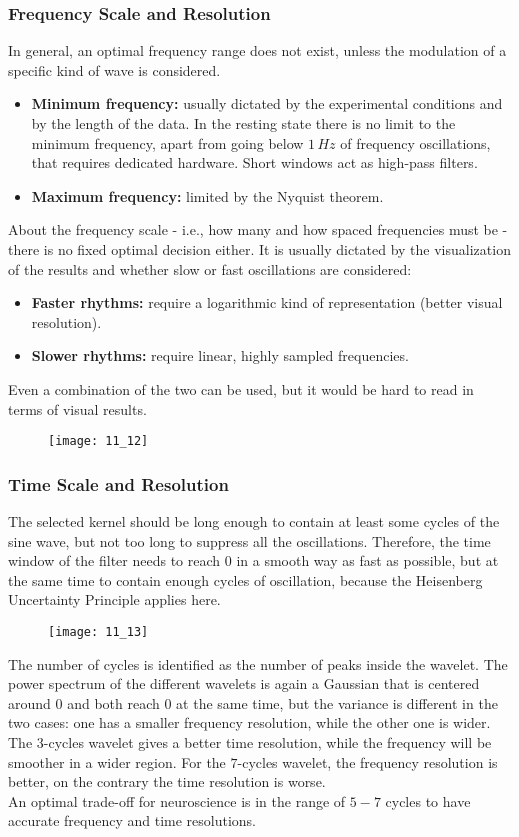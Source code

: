 \subsubsection{Frequency Scale and Resolution}
In general, an optimal frequency range does not exist, unless the modulation of a specific kind of wave is
considered.
\begin{itemize}
    \item \textbf{Minimum frequency:} usually dictated by the experimental conditions and by the length of the
    data. In the resting state there is no limit to the minimum frequency, apart from going below \(1\,Hz\)
    of frequency oscillations, that requires dedicated hardware. Short windows act as high-pass filters.
    \item \textbf{Maximum frequency:} limited by the Nyquist theorem.
\end{itemize}
About the frequency scale - i.e., how many and how spaced frequencies must be - there is no fixed optimal
decision either. It is usually dictated by the visualization of the results and whether slow or fast
oscillations are considered:
\begin{itemize}
    \item \textbf{Faster rhythms:} require a logarithmic kind of representation (better visual resolution).
    \item \textbf{Slower rhythms:} require linear, highly sampled frequencies.
\end{itemize}
Even a combination of the two can be used, but it would be hard to read in terms of visual results.
\begin{figure}[H]
    \texttt{[image: 11\_12]}
    \centering
\end{figure}
\subsubsection{Time Scale and Resolution}
The selected kernel should be long enough to contain at least some cycles of the sine wave, but not too long
to suppress all the oscillations. Therefore, the time window of the filter needs to reach 0 in a smooth way
as fast as possible, but at the same time to contain enough cycles of oscillation, because the Heisenberg
Uncertainty Principle applies here.
\begin{figure}[H]
    \texttt{[image: 11\_13]}
    \centering
\end{figure}
The number of cycles is identified as the number of peaks inside the
wavelet. The power spectrum of the different wavelets is again a Gaussian that is centered around 0 and both
reach 0 at the same time, but the variance is different in the two cases: one has a smaller frequency
resolution, while the other one is wider. The \(3\)-cycles wavelet gives a better time resolution, while the
frequency will be smoother in a wider region. For the \(7\)-cycles wavelet, the frequency resolution is better, on
the contrary the time resolution is worse.\\
An optimal trade-off for neuroscience is in the range of \(5-7\) cycles to have accurate frequency and time
resolutions.
